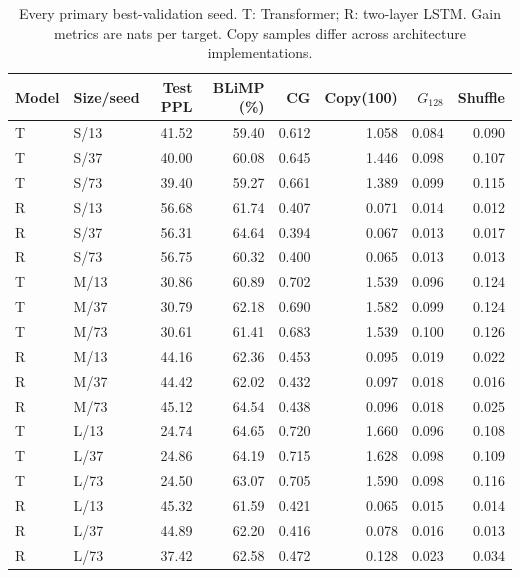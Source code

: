 \documentclass[10pt]{article}
\begin{document}
\begin{table}[ht]
\centering
\small
\begin{tabular}{llrrrrrr}
\toprule
Model & Size/seed & Test PPL & BLiMP (\%) & CG & Copy(100) & $G_{128}$ & Shuffle \\
\midrule
T & S/13 & 41.52 & 59.40 & 0.612 & 1.058 & 0.084 & 0.090 \\
T & S/37 & 40.00 & 60.08 & 0.645 & 1.446 & 0.098 & 0.107 \\
T & S/73 & 39.40 & 59.27 & 0.661 & 1.389 & 0.099 & 0.115 \\
R & S/13 & 56.68 & 61.74 & 0.407 & 0.071 & 0.014 & 0.012 \\
R & S/37 & 56.31 & 64.64 & 0.394 & 0.067 & 0.013 & 0.017 \\
R & S/73 & 56.75 & 60.32 & 0.400 & 0.065 & 0.013 & 0.013 \\
\midrule
T & M/13 & 30.86 & 60.89 & 0.702 & 1.539 & 0.096 & 0.124 \\
T & M/37 & 30.79 & 62.18 & 0.690 & 1.582 & 0.099 & 0.124 \\
T & M/73 & 30.61 & 61.41 & 0.683 & 1.539 & 0.100 & 0.126 \\
R & M/13 & 44.16 & 62.36 & 0.453 & 0.095 & 0.019 & 0.022 \\
R & M/37 & 44.42 & 62.02 & 0.432 & 0.097 & 0.018 & 0.016 \\
R & M/73 & 45.12 & 64.54 & 0.438 & 0.096 & 0.018 & 0.025 \\
\midrule
T & L/13 & 24.74 & 64.65 & 0.720 & 1.660 & 0.096 & 0.108 \\
T & L/37 & 24.86 & 64.19 & 0.715 & 1.628 & 0.098 & 0.109 \\
T & L/73 & 24.50 & 63.07 & 0.705 & 1.590 & 0.098 & 0.116 \\
R & L/13 & 45.32 & 61.59 & 0.421 & 0.065 & 0.015 & 0.014 \\
R & L/37 & 44.89 & 62.20 & 0.416 & 0.078 & 0.016 & 0.013 \\
R & L/73 & 37.42 & 62.58 & 0.472 & 0.128 & 0.023 & 0.034 \\
\midrule
\bottomrule
\end{tabular}
\caption{Every primary best-validation seed. T: Transformer; R: two-layer LSTM. Gain metrics are nats per target. Copy samples differ across architecture implementations.}
\label{tab:seeds}
\end{table}
\end{document}
